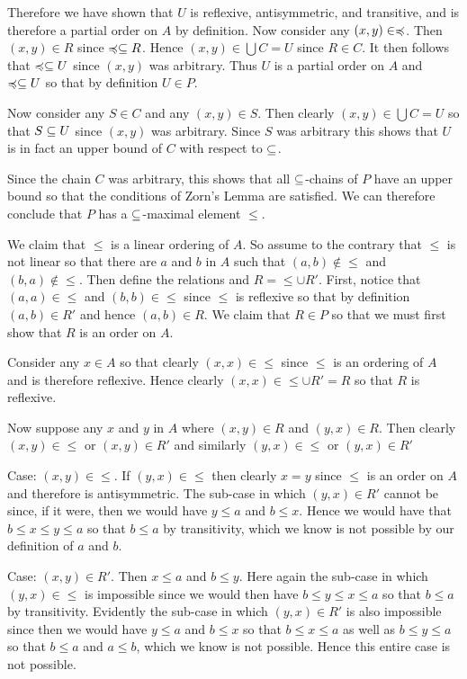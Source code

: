{{    Therefore we have shown that $U$ is reflexive, antisymmetric, and transitive, and is therefore a partial order on $A$ by definition.
    Now consider any $(x,y) \in \prece$.
    Then $(x,y) \in R$ since $\prece \ss R$.
    Hence $(x,y) \in \bigcup C = U$ since $R \in C$.
    It then follows that $\prece \ss U$ since $(x,y)$ was arbitrary.
    Thus $U$ is a partial order on $A$ and $\prece \ss U$ so that by definition $U \in P$.

    Now consider any $S \in C$ and any $(x,y) \in S$.
    Then clearly $(x,y) \in \bigcup C = U$ so that $S \ss U$ since $(x,y)$ was arbitrary.
    Since $S$ was arbitrary this shows that $U$ is in fact an upper bound of $C$ with respect to $\ss$.

    Since the chain $C$ was arbitrary, this shows that all $\ss$-chains of $P$ have an upper bound so that the conditions of Zorn's Lemma are satisfied.
    We can therefore conclude that $P$ has a $\ss$-maximal element $\leq$.

    We claim that $\leq$ is a linear ordering of $A$.
    So assume to the contrary that $\leq$ is not linear so that there are $a$ and $b$ in $A$ such that $(a,b) \notin \leq$ and $(b,a) \notin \leq$.
    Then define the relations
    and $R = \leq \cup R'$.
    First, notice that $(a,a) \in \leq$ and $(b,b) \in \leq$ since $\leq$ is reflexive so that by definition $(a,b) \in R'$ and hence $(a,b) \in R$.
    We claim that $R \in P$ so that we must first show that $R$ is an order on $A$.

    Consider any $x \in A$ so that clearly $(x,x) \in \leq$ since $\leq$ is an ordering of $A$ and is therefore reflexive.
    Hence clearly $(x,x) \in \leq \cup R' = R$ so that $R$ is reflexive.

    Now suppose any $x$ and $y$ in $A$ where $(x,y) \in R$ and $(y,x) \in R$.
    Then clearly $(x,y) \in \leq$ or $(x,y) \in R'$ and similarly $(y,x) \in \leq$ or $(y,x) \in R'$

    Case: $(x,y) \in \leq$. If $(y,x) \in \leq$ then clearly $x=y$ since $\leq$ is an order on $A$ and therefore is antisymmetric.
    The sub-case in which $(y,x) \in R'$ cannot be since, if it were, then we would have $y \leq a$ and $b \leq x$.
    Hence we would have that $b \leq x \leq y \leq a$ so that $b \leq a$ by transitivity, which we know is not possible by our definition of $a$ and $b$.

    Case: $(x,y) \in R'$.
    Then $x \leq a$ and $b \leq y$.
    Here again the sub-case in which $(y,x) \in \leq$ is impossible since we would then have $b \leq y \leq x \leq a$ so that $b \leq a$ by transitivity.
    Evidently the sub-case in which $(y,x) \in R'$ is also impossible since then we would have $y \leq a$ and $b \leq x$ so that $b \leq x \leq a$ as well as $b \leq y \leq a$ so that $b \leq a$ and $a \leq b$, which we know is not possible.
    Hence this entire case is not possible.

}}
